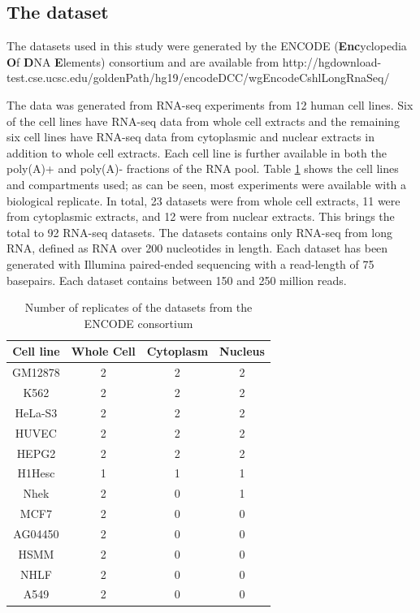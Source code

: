 \subsection{The dataset}
The datasets used in this study were generated by the ENCODE
(\textbf{Enc}yclopedia \textbf{O}f \textbf{D}NA \textbf{E}lements) consortium
and are available from http://hgdownload-test.cse.ucsc.edu/goldenPath/hg19/encodeDCC/wgEncodeCshlLongRnaSeq/

The data was generated from RNA-seq experiments from 12 human cell lines. Six
of the cell lines have RNA-seq data from whole cell extracts and the remaining
six cell lines have RNA-seq data from cytoplasmic and nuclear extracts in
addition to whole cell extracts. Each cell line is further available in both the
poly(A)+ and poly(A)- fractions of the RNA pool. Table \ref{tab:Datasets} shows
the cell lines and compartments used; as can be seen, most experiments were
available with a biological replicate. In total, 23 datasets were from whole
cell extracts, 11 were from cytoplasmic extracts, and 12 were from nuclear
extracts. This brings the total to 92 RNA-seq datasets. The datasets contains
only RNA-seq from long RNA, defined as RNA over 200 nucleotides in length. Each
dataset has been generated with Illumina paired-ended sequencing with a
read-length of 75 basepairs. Each dataset contains between 150 and 250 million
reads.

\begin{table}
	\centering
	\begin{tabular}{cccc}
	  Cell line & Whole Cell & Cytoplasm & Nucleus \\
	  \midrule
	  GM12878 & 2 & 2 & 2 \\
	  K562 & 2 & 2 & 2 \\
	  HeLa-S3 & 2 & 2 & 2 \\
	  HUVEC & 2 & 2 & 2 \\
	  HEPG2 & 2 & 2 & 2 \\
	  H1Hesc & 1 & 1 & 1 \\
	  Nhek & 2 & 0 & 1 \\
	  MCF7 & 2 & 0 & 0 \\
	  AG04450 & 2 & 0 & 0 \\
	  HSMM & 2 & 0 & 0 \\
	  NHLF & 2 & 0 & 0 \\
	  A549 & 2 & 0 & 0 \\
	\end{tabular}
	\caption{Number of replicates of the datasets from the ENCODE consortium}
	\label{tab:Datasets}
\end{table}

